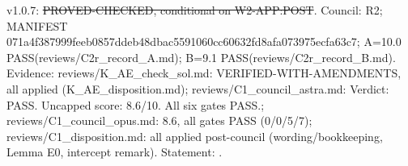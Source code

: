 \begin{theorem}\label{reg:W3-POST2_A1}
\end{theorem}
\begin{statusbox}
 v1.0.7: \st{PROVED-CHECKED, conditional on W2-APP:POST}. Council: R2; MANIFEST 071a4f387999feeb0857ddeb48dbac5591060cc60632fd8afa073975ecfa63c7; A=10.0 PASS(reviews/C2r\_record\_A.md); B=9.1 PASS(reviews/C2r\_record\_B.md). Evidence: reviews/K\_AE\_check\_sol.md: VERIFIED-WITH-AMENDMENTS, all applied (K\_AE\_disposition.md); reviews/C1\_council\_astra.md: Verdict: PASS. Uncapped score: 8.6/10. All six gates PASS.; reviews/C1\_council\_opus.md: 8.6, all gates PASS (0/0/5/7); reviews/C1\_disposition.md: all applied post-council (wording/bookkeeping, Lemma E0, intercept remark). Statement: .
\end{statusbox}
